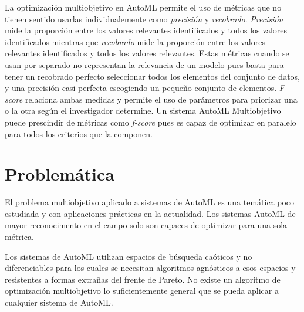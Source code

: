 La optimizaci\'on multiobjetivo en AutoML permite el uso de m\'etricas que no tienen sentido usarlas individualemente como \textit{precisi\'on} y \textit{recobrado}. 
 \textit{Precisi\'on} mide la proporci\'on entre los valores relevantes identificados y todos los valores identificados
 mientras que \textit{recobrado} mide la proporci\'on entre los valores relevantes identificados y todos los valores relevantes.
Estas m\'etricas cuando se usan por separado no representan la relevancia de un modelo pues basta para tener un recobrado perfecto seleccionar todos los elementos del conjunto de datos, y una precisi\'on casi perfecta escogiendo un pequeño conjunto de elementos.
\textit{F-score} relaciona ambas medidas y permite el uso de  par\'ametros para priorizar una o la otra seg\'un el investigador determine. 
Un sistema AutoML Multiobjetivo puede prescindir de m\'etricas como \textit{f-score} pues es capaz de optimizar en paralelo para todos los criterios que la componen.

\section*{Problem\'atica}
El problema multiobjetivo aplicado a sistemas de AutoML es una tem\'atica poco estudiada y con aplicaciones pr\'acticas en la actualidad.
Los sistemas AutoML de mayor reconocimento en el campo solo son capaces de optimizar para una sola m\'etrica. 

Los sistemas de AutoML utilizan espacios de b\'usqueda ca\'oticos y no diferenciables para los cuales se necesitan algoritmos agn\'osticos a esos espacios y resistentes a formas extra\~nas del frente de Pareto. No existe un algoritmo de optimizaci\'on multiobjetivo lo suficientemente general que se pueda aplicar a cualquier sistema de AutoML.

